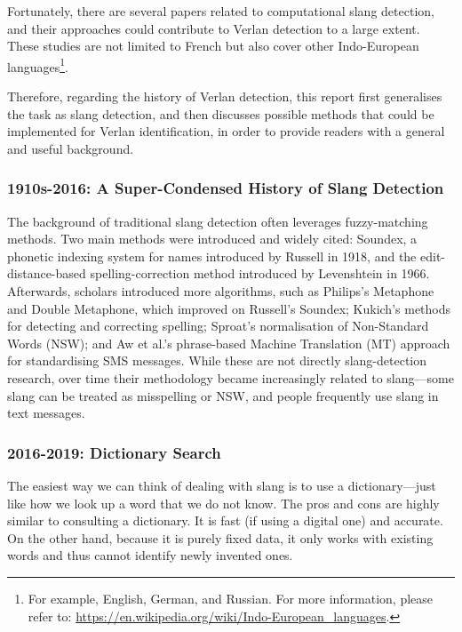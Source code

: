 \documentclass[12pt]{article}
\begin{document}
Fortunately, there are several papers related to computational slang detection, and their approaches could contribute to Verlan detection to a large extent\cite{pei2019slang, sun2024informal, slangornot2024, wu2018slangsd}. These studies are not limited to French but also cover other Indo-European languages\footnote{For example, English, German, and Russian. For more information, please refer to: \url{https://en.wikipedia.org/wiki/Indo-European_languages}.}.

Therefore, regarding the history of Verlan detection, this report first generalises the task as slang detection, and then discusses possible methods that could be implemented for Verlan identification, in order to provide readers with a general and useful background.

\subsubsection{1910s-2016: A Super-Condensed History of Slang Detection}

The background of traditional slang detection often leverages fuzzy-matching methods. Two main methods were introduced and widely cited: Soundex, a phonetic indexing system for names introduced by Russell in 1918, and the edit-distance-based spelling-correction method introduced by Levenshtein in 1966\cite{russell1918soundex, levenshtein1966}. Afterwards, scholars introduced more algorithms, such as Philips's Metaphone and Double Metaphone, which improved on Russell's Soundex; Kukich's methods for detecting and correcting spelling; Sproat's normalisation of Non-Standard Words (NSW); and Aw et al.'s phrase-based Machine Translation (MT) approach for standardising SMS messages\cite{philips1990metaphone,philips2000doublemetaphone, kukich1992techniques,sproat2001normalization,aw2006phrase}. While these are not directly slang-detection research, over time their methodology became increasingly related to slang\;---\;some slang can be treated as misspelling or NSW, and people frequently use slang in text messages.


\subsubsection{2016-2019: Dictionary Search}

The easiest way we can think of dealing with slang is to use a dictionary\;---\;just like how we look up a word that we do not know. The pros and cons are highly similar to consulting a dictionary. It is fast (if using a digital one) and accurate. On the other hand, because it is purely fixed data, it only works with existing words and thus cannot identify newly invented ones.
\end{document}
